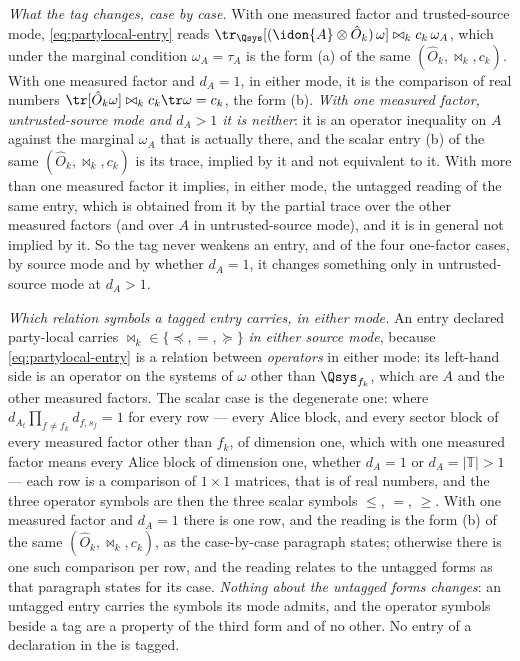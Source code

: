 \begin{definition}
\emph{What the tag changes, case by case.} With one measured factor and
trusted-source mode, \eqref{eq:partylocal-entry} reads
$\tr_{\Qsys}[(\idon{A}\otimes\hat O_k)\,\omega]\bowtie_kc_k\,\omega_A$, which
under the marginal condition $\omega_A=\tau_A$ is the form (a) of the same
$(\hat O_k,\bowtie_k,c_k)$. With one measured factor and $d_A=1$, in either
mode, it is the comparison of real numbers
$\tr[\hat O_k\omega]\bowtie_kc_k\tr\omega=c_k$, the form (b). \emph{With one
measured factor, untrusted-source mode and $d_A>1$ it is neither}: it is an
operator inequality on $A$ against the marginal $\omega_A$ that is actually
there, and the scalar entry (b) of the same $(\hat O_k,\bowtie_k,c_k)$ is its
trace, implied by it and not equivalent to it. With more than one measured
factor it implies, in either mode, the untagged reading of the same entry,
which is obtained from it by the partial trace over the other measured
factors (and over $A$ in untrusted-source mode), and it is in general not
implied by it. So the tag never weakens an entry, and of the four one-factor
cases, by source mode and by whether $d_A=1$, it changes something only in
untrusted-source mode at $d_A>1$.

\emph{Which relation symbols a tagged entry carries, in either mode.} An entry
declared party-local carries $\bowtie_k\in\{\preceq,=,\succeq\}$ \emph{in
either source mode}, because \eqref{eq:partylocal-entry} is a relation
between \emph{operators} in either mode: its left-hand side is an operator on
the systems of $\omega$ other than $\Qsys_{f_k}$, which are $A$ and the other
measured factors. The scalar case is the degenerate one: where
$d_{A_t}\prod_{f\ne f_k}d_{f,s_f}=1$ for every row --- every Alice block, and
every sector block of every measured factor other than $f_k$, of dimension
one, which with one measured factor means every Alice block of dimension one,
whether $d_A=1$ or $d_A=|\mathbb{T}|>1$ --- each row is a comparison of
$1\times1$ matrices, that is of real numbers, and the three operator symbols
are then the three scalar symbols $\le$, $=$, $\ge$. With one measured factor
and $d_A=1$ there is one row, and the reading is the form (b) of the same
$(\hat O_k,\bowtie_k,c_k)$, as the case-by-case paragraph states; otherwise
there is one such comparison per row, and the reading relates to the untagged
forms as that paragraph states for its case. \emph{Nothing about the
untagged forms changes}: an untagged entry carries the symbols its mode
admits, and the operator symbols beside a tag are a property of the third
form and of no other. No entry of a declaration in the  is
tagged.
\end{definition}
